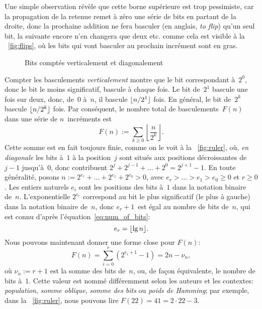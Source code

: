 Une simple observation révèle que cette borne supérieure est trop
pessimiste, car la propagation de la retenue remet à zéro une série de
bits en partant de la droite, donc la prochaine addition ne fera
basculer (en anglais, \emph{to flip}) qu'un seul bit, la suivante
encore n'en changera que deux etc. comme cela est visible à la
\fig~\vref{fig:flips}, où les bits qui vont basculer au prochain
incrément sont en gras.
\begin{figure}[t]
\centering
{}
\qquad
{}
\caption{Bits comptés verticalement et diagonalement}
\end{figure}
Compter les basculements \emph{verticalement} montre que le bit
correspondant à~\(2^0\), donc le bit le moins significatif, bascule à
chaque fois. Le bit de~\(2^1\) bascule une fois sur deux, donc,
de~\(0\) à~\(n\), il bascule \(\lfloor{n/2^1}\rfloor\) fois. En général, le
bit de~\(2^k\) bascule \(\lfloor{n/2^k}\rfloor\) fois. Par conséquent, le
nombre total de basculements~\(F(n)\) dans une série de
\(n\)~incréments est
\begin{equation}
F(n) := \sum_{k \geqslant 0}{\left\lfloor\frac{n}{2^k}\right\rfloor}.
\label{eq:F}
\end{equation}
Cette somme est en fait toujours finie, comme on le voit à la
\fig~\vref{fig:ruler}, où, \emph{en diagonale} les bits à~\(1\) à la
position~\(j\) sont situés aux positions décroissantes de~\(j-1\)
jusqu'à~\(0\), donc contribuent \(2^j + 2^{j-1} + \dots + 2^0 =
2^{j+1}-1\).  En toute généralité, posons \(n := 2^{e_r} + \dots +
2^{e_1} + 2^{e_0} > 0\), avec \(e_r > \dots > e_1 > e_0 \geqslant 0\)
et \(r \geqslant 0\). Les entiers naturels \(e_i\) sont les positions
des bits à~\(1\) dans la notation binaire de~\(n\). L'exponentielle
\(2^{e_r}\) correspond au bit le plus significatif (le plus à gauche)
dans la notation binaire de~\(n\), donc \(e_r+1\)~est égal au nombre
de bits de~\(n\), qui est connu d'après
l'équation~\eqref{eq:num_of_bits}:
\begin{equation}
e_r = \lfloor{\lg n}\rfloor.\label{eq:e_r}
\end{equation}
Nous pouvons maintenant donner une forme close pour \(F(n)\):
\begin{equation}
F(n) = \sum_{i=0}^{r}(2^{e_i+1} - 1) = 2n - \nu_n,
\label{eq:ruler_nu}
\end{equation}
où \(\nu_n := r + 1\) est la somme des bits de~\(n\), ou, de façon équivalente,
le nombre de bits à~\(1\). Cette valeur est nommé différemment selon
les auteurs et les contextes: \emph{population}, \emph{somme oblique},
\emph{somme des bits} ou \emph{poids de
  Hamming}; par exemple, dans la \fig~\vref{fig:ruler}, nous pouvons
lire \(F(22) = 41 = 2 \cdot 22 - 3\).

